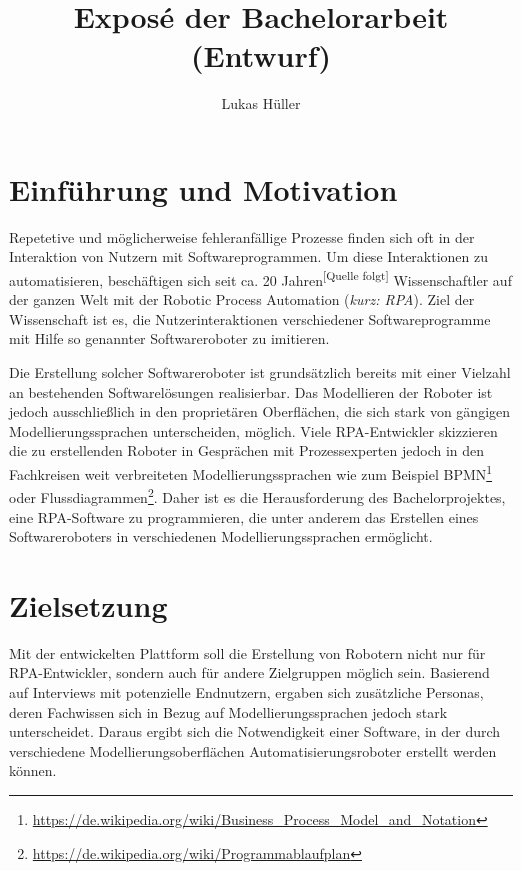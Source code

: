 \documentclass[a4paper, ngerman ]{article}
\title{Exposé der Bachelorarbeit (Entwurf)}
\author{Lukas Hüller}
\begin{document}
\maketitle

\section{Einführung und Motivation}

Repetetive und möglicherweise fehleranfällige Prozesse finden sich oft in der Interaktion von Nutzern mit Softwareprogrammen. Um diese Interaktionen zu automatisieren, beschäftigen sich seit ca. 20 Jahren\textsuperscript{[Quelle folgt]} Wissenschaftler auf der ganzen Welt mit der \glqq Robotic Process Automation\grqq{} (\textit{kurz: RPA}). Ziel der Wissenschaft ist es, die Nutzerinteraktionen verschiedener Softwareprogramme mit Hilfe so genannter \glqq Softwareroboter\grqq{} zu imitieren.

Die Erstellung solcher Softwareroboter ist grundsätzlich bereits mit einer Vielzahl an bestehenden Softwarelösungen realisierbar. Das Modellieren der Roboter ist jedoch ausschließlich in den pro­p­ri­e­tären Oberflächen, die sich stark von gängigen Modellierungssprachen unterscheiden, möglich. Viele RPA-Entwickler skizzieren die zu erstellenden Roboter in Gesprächen mit Prozessexperten jedoch in den Fachkreisen weit verbreiteten Modellierungssprachen wie zum Beispiel BPMN\footnote{\url{https://de.wikipedia.org/wiki/Business_Process_Model_and_Notation}} oder Flussdiagrammen\footnote{\url{https://de.wikipedia.org/wiki/Programmablaufplan}}. Daher ist es die Herausforderung des Bachelorprojektes, eine RPA-Software zu programmieren, die unter anderem das Erstellen eines Softwareroboters in verschiedenen Modellierungssprachen ermöglicht. 

\section{Zielsetzung}

Mit der entwickelten Plattform soll die Erstellung von Robotern nicht nur für RPA-Entwickler, sondern auch für andere Zielgruppen möglich sein. Basierend auf Interviews mit potenzielle Endnutzern, ergaben sich zusätzliche Personas, deren Fachwissen sich in Bezug auf Modellierungssprachen jedoch stark unterscheidet. 
Daraus ergibt sich die Notwendigkeit einer Software, in der durch verschiedene Modellierungsoberflächen Automatisierungsroboter erstellt werden können. 
\end{document}
